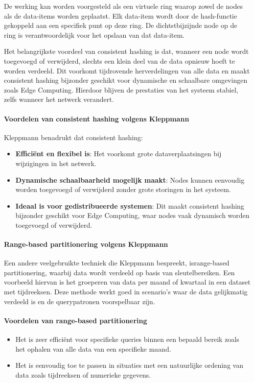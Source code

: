 De werking kan worden voorgesteld als een virtuele ring waarop zowel de nodes als de data-items worden geplaatst. Elk data-item wordt door de hash-functie gekoppeld aan een specifiek punt op deze ring. De dichtstbijzijnde node op de ring is verantwoordelijk voor het opslaan van dat data-item.  
 
Het belangrijkste voordeel van consistent hashing is dat, wanneer een node wordt toegevoegd of verwijderd, slechts een klein deel van de data opnieuw hoeft te worden verdeeld. Dit voorkomt tijdrovende herverdelingen van alle data en maakt consistent hashing bijzonder geschikt voor dynamische en schaalbare omgevingen zoals Edge Computing. Hierdoor blijven de prestaties van het systeem stabiel, zelfs wanneer het netwerk verandert.
 
\paragraph{Voordelen van consistent hashing volgens Kleppmann}  
Kleppmann benadrukt dat consistent hashing:  
\begin{itemize}
    \item \textbf{Efficiënt en flexibel is}: Het voorkomt grote dataverplaatsingen bij wijzigingen in het netwerk.  
    \item \textbf{Dynamische schaalbaarheid mogelijk maakt}: Nodes kunnen eenvoudig worden toegevoegd of verwijderd zonder grote storingen in het systeem.  
    \item \textbf{Ideaal is voor gedistribueerde systemen}: Dit maakt consistent hashing bijzonder geschikt voor Edge Computing, waar nodes vaak dynamisch worden toegevoegd of verwijderd.  
\end{itemize}
 
\paragraph{Range-based partitionering volgens Kleppmann}  
Een andere veelgebruikte techniek die Kleppmann bespreekt, isrange-based partitionering, waarbij data wordt verdeeld op basis van sleutelbereiken. Een voorbeeld hiervan is het groeperen van data per maand of kwartaal in een dataset met tijdreeksen. Deze methode werkt goed in scenario's waar de data gelijkmatig verdeeld is en de querypatronen voorspelbaar zijn.
 
\paragraph{Voordelen van range-based partitionering}  
\begin{itemize}
    \item Het is zeer efficiënt voor specifieke queries binnen een bepaald bereik zoals het ophalen van alle data van een specifieke maand.  
    \item Het is eenvoudig toe te passen in situaties met een natuurlijke ordening van data zoals tijdreeksen of numerieke gegevens.  
\end{itemize}
 

